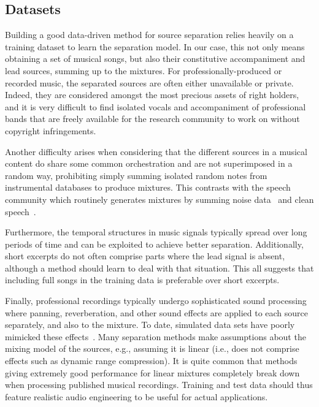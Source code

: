 \subsection{Datasets}
\label{ssec:datasets}

Building a good data-driven method for source separation relies heavily on a training dataset to learn the separation model. In our case, this not only means obtaining a set of musical songs, but also their constitutive accompaniment and lead sources, summing up to the mixtures. For professionally-produced or recorded music, the separated sources are often either unavailable or private. Indeed, they are considered amongst the most precious assets of right holders, and it is very difficult to find isolated vocals and accompaniment of professional bands that are freely available for the research community to work on without copyright infringements.

Another difficulty arises when considering that the different sources in a musical content do share some common orchestration and are not superimposed in a random way, prohibiting simply summing isolated random notes from instrumental databases to produce mixtures. This contrasts with the speech community which routinely generates mixtures by summing noise data~\cite{varga93} and clean speech~\cite{garofolo93}.

 Furthermore, the temporal structures in music signals typically spread over long periods of time and can be exploited to achieve better separation. Additionally, short excerpts do not often comprise parts where the lead signal is absent, although a method should learn to deal with that situation. This all suggests that including full songs in the training data is preferable over short excerpts.

Finally, professional recordings typically undergo sophisticated sound processing where panning, reverberation, and other sound effects are applied to each source separately, and also to the mixture. To date, simulated data sets have poorly mimicked these effects~\cite{sturmel12}. Many separation methods make  assumptions about the mixing model of the sources, e.g., assuming it is linear (i.e., does not comprise effects such as dynamic range compression). It is quite common that methods giving extremely good performance for linear mixtures completely break down when processing published musical recordings. Training and test data should thus feature realistic audio engineering to be useful for actual applications.

